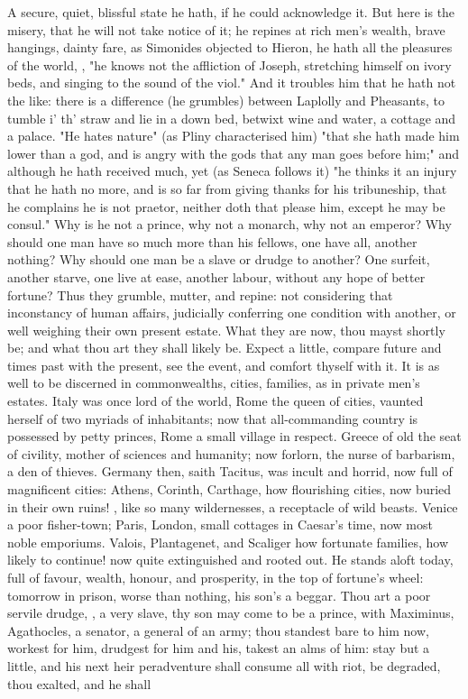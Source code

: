 {A secure, quiet, blissful state he hath, if he could acknowledge it. But here is the misery, that he will not take notice of it; he repines at rich men's wealth, brave hangings, dainty fare, as Simonides objected to Hieron, he hath all the pleasures of the world, , "he knows not the affliction of Joseph, stretching himself on ivory beds, and singing to the sound of the viol." And it troubles him that he hath not the like: there is a difference (he grumbles) between Laplolly and Pheasants, to tumble i' th' straw and lie in a down bed, betwixt wine and water, a cottage and a palace. "He hates nature" (as Pliny characterised him) "that she hath made him lower than a god, and is angry with the gods that any man goes before him;" and although he hath received much, yet (as Seneca follows it) "he thinks it an injury that he hath no more, and is so far from giving thanks for his tribuneship, that he complains he is not praetor, neither doth that please him, except he may be consul." Why is he not a prince, why not a monarch, why not an emperor? Why should one man have so much more than his fellows, one have all, another nothing? Why should one man be a slave or drudge to another? One surfeit, another starve, one live at ease, another labour, without any hope of better fortune? Thus they grumble, mutter, and repine: not considering that inconstancy of human affairs, judicially conferring one condition with another, or well weighing their own present estate. What they are now, thou mayst shortly be; and what thou art they shall likely be. Expect a little, compare future and times past with the present, see the event, and comfort thyself with it. It is as well to be discerned in commonwealths, cities, families, as in private men's estates. Italy was once lord of the world, Rome the queen of cities, vaunted herself of two myriads of inhabitants; now that all-commanding country is possessed by petty princes, Rome a small village in respect. Greece of old the seat of civility, mother of sciences and humanity; now forlorn, the nurse of barbarism, a den of thieves. Germany then, saith Tacitus, was incult and horrid, now full of magnificent cities: Athens, Corinth, Carthage, how flourishing cities, now buried in their own ruins! , like so many wildernesses, a receptacle of wild beasts. Venice a poor fisher-town; Paris, London, small cottages in Caesar's time, now most noble emporiums. Valois, Plantagenet, and Scaliger how fortunate families, how likely to continue! now quite extinguished and rooted out. He stands aloft today, full of favour, wealth, honour, and prosperity, in the top of fortune's wheel: tomorrow in prison, worse than nothing, his son's a beggar. Thou art a poor servile drudge, , a very slave, thy son may come to be a prince, with Maximinus, Agathocles, \etc{} a senator, a general of an army; thou standest bare to him now, workest for him, drudgest for him and his, takest an alms of him: stay but a little, and his next heir peradventure shall consume all with riot, be degraded, thou exalted, and he shall }
